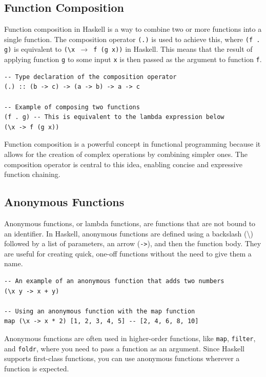 \documentclass[a4paper, 10pt]{article}
\begin{document}
        \subsection{Function Composition}
            Function composition in Haskell is a way to combine two or more functions into a single function. The composition operator \texttt{(.)} is used to achieve this, where \texttt{(f . g)} is equivalent to \texttt{(\textbackslash x $\rightarrow$ f (g x))} in Haskell. This means that the result of applying function \texttt{g} to some input \texttt{x} is then passed as the argument to function \texttt{f}.

            \lstset{language=Haskell}
            \begin{lstlisting}
-- Type declaration of the composition operator
(.) :: (b -> c) -> (a -> b) -> a -> c

-- Example of composing two functions
(f . g) -- This is equivalent to the lambda expression below
(\x -> f (g x))
            \end{lstlisting}

            \noindent Function composition is a powerful concept in functional programming because it allows for the creation of complex operations by combining simpler ones. The composition operator is central to this idea, enabling concise and expressive function chaining.


        \subsection{Anonymous Functions}

            Anonymous functions, or lambda functions, are functions that are not bound to an identifier. In Haskell, anonymous functions are defined using a backslash (\textbackslash) followed by a list of parameters, an arrow (\texttt{->}), and then the function body. They are useful for creating quick, one-off functions without the need to give them a name.

            \lstset{language=Haskell}
            \begin{lstlisting}
-- An example of an anonymous function that adds two numbers
(\x y -> x + y)

-- Using an anonymous function with the map function
map (\x -> x * 2) [1, 2, 3, 4, 5] -- [2, 4, 6, 8, 10]
            \end{lstlisting}

            \noindent Anonymous functions are often used in higher-order functions, like \texttt{map}, \texttt{filter}, and \texttt{foldr}, where you need to pass a function as an argument. Since Haskell supports first-class functions, you can use anonymous functions wherever a function is expected.
            \newpage
\end{document}

